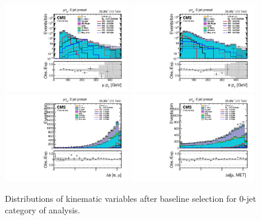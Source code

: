 \begin{figure}[htbp]
     \centering
     \includegraphics[width=0.48\textwidth]{plots_and_figures/chapter5/preselection_HM/log_mutaue_0jet_presel_mPt.pdf}
     \includegraphics[width=0.48\textwidth]{plots_and_figures/chapter5/preselection_HM/log_mutaue_0jet_presel_ePt.pdf}\\
     \includegraphics[width=0.48\textwidth]{plots_and_figures/chapter5/preselection_HM/mutaue_0jet_presel_dphiemu.pdf}
     \includegraphics[width=0.48\textwidth]{plots_and_figures/chapter5/preselection_HM/mutaue_0jet_presel_dphiMuMet.pdf}\\
     \caption{Distributions of kinematic variables after baseline selection for 0-jet category of \Hmue analysis.}
     \label{fig:Hmutaue_presel1}
\end{figure}

